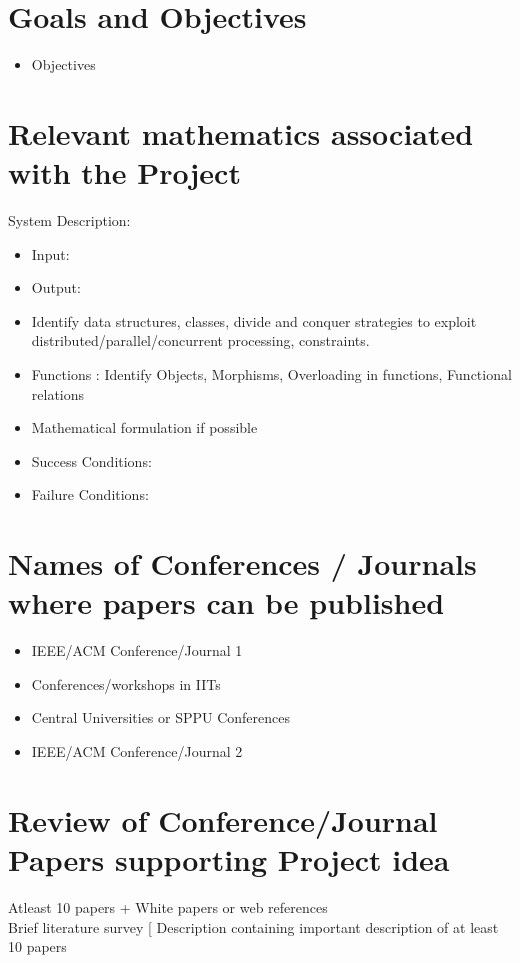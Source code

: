 \documentclass[oneside,a4paper,12pt]{report}
\begin{document}
\section{Goals and Objectives}
\begin{itemize}
	\item Objectives
\end{itemize}

	
\section{Relevant mathematics associated with the Project}
\label{sec:math}
System Description:
\begin{itemize} 
\item Input:	 
\item Output:	 
\item Identify data structures, classes, divide and conquer strategies to exploit distributed/parallel/concurrent processing, constraints. 
\item Functions : Identify Objects, Morphisms, Overloading in functions, Functional relations
\item Mathematical formulation if possible
\item Success Conditions:	 
\item Failure Conditions:		
\end{itemize}


\section{Names of Conferences / Journals where papers can be published}
\begin{itemize}
\item  IEEE/ACM Conference/Journal 1 
\item  Conferences/workshops in IITs
\item  Central Universities or SPPU Conferences 
\item IEEE/ACM Conference/Journal 2 
\end{itemize}


\section{Review of Conference/Journal Papers supporting Project idea}
\label{sec:survey}
   Atleast 10 papers + White papers or web references\\
   Brief literature survey [ Description containing important description of at least 10 papers
\end{document}
